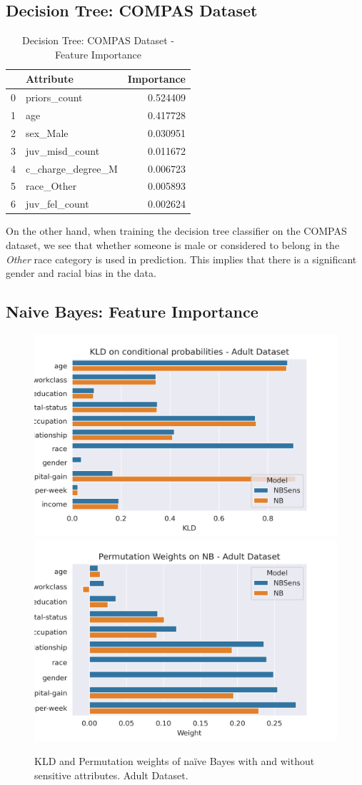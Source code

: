 \subsection{Decision Tree: COMPAS Dataset}

\begin{table}[]
    \centering
    \begin{tabular}{llr}
    \toprule
    {} &          Attribute &  Importance \\
    \midrule
    0 &       priors\_count &    0.524409 \\
    1 &                age &    0.417728 \\
    2 &           sex\_Male &    0.030951 \\
    3 &     juv\_misd\_count &    0.011672 \\
    4 &  c\_charge\_degree\_M &    0.006723 \\
    5 &         race\_Other &    0.005893 \\
    6 &      juv\_fel\_count &    0.002624 \\
    \bottomrule
    \end{tabular}
    \caption{Decision Tree: COMPAS Dataset - Feature Importance}
    \label{tab:detreecompasimp}
\end{table}

On the other hand, when training the decision tree classifier on the COMPAS dataset, we see that whether someone is male or considered to belong in the \emph{Other} race category is used in prediction. This implies that there is a significant gender and racial bias in the data.

\subsection{Naive Bayes: Feature Importance}

\begin{figure}
    \centering
    \includegraphics[width=0.49\linewidth]{figures/KLDimportance-adult.png}
    \includegraphics[width=0.49\linewidth]{figures/permimportance-adult.png}
    \caption{KLD and Permutation weights of naïve Bayes with and without sensitive attributes. Adult Dataset.}
    \label{fig:kldpermimpadult}
\end{figure}

